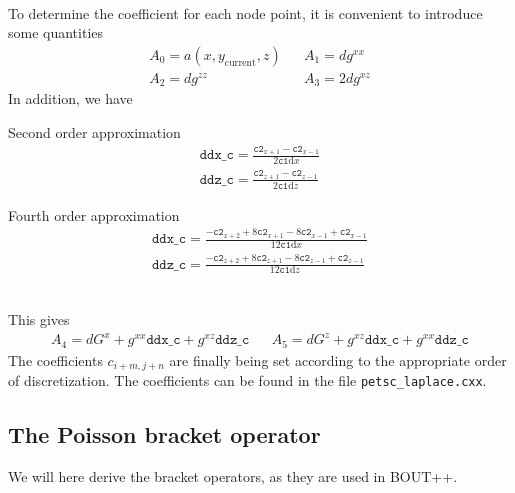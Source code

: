 \documentclass[12pt]{article}
\begin{document}
%
\\ To determine the coefficient for each node point, it is convenient to
introduce some quantities
%
\begin{align*}
    &A_0 = a(x,y_{\text{current}},z)& &A_1 = dg^{xx}&\\ &A_2 = dg^{zz}& &A_3 =
    2dg^{xz}&
\end{align*}
%
In addition, we have\\
%
\begin{minipage}{0.45\textwidth}
Second order approximation
%
\begin{align*}
    \texttt{ddx\_c} = \frac{\texttt{c2}_{x+1} - \texttt{c2}_{x-1} }{
    2\texttt{c1}\text{d}x}\\
    \texttt{ddz\_c} = \frac{\texttt{c2}_{z+1} - \texttt{c2}_{z-1} }{
    2\texttt{c1}\text{d}z}
\end{align*}
%
\end{minipage}
%
\hspace{1cm}
%
\begin{minipage}{0.45\textwidth}
Fourth order approximation
%
\begin{align*}
    \texttt{ddx\_c} = \frac{-\texttt{c2}_{x+2} + 8\texttt{c2}_{x+1} -
    8\texttt{c2}_{x-1} + \texttt{c2}_{x-1} }{ 12\texttt{c1}\text{d}x}\\
    \texttt{ddz\_c} = \frac{-\texttt{c2}_{z+2} + 8\texttt{c2}_{z+1} -
    8\texttt{c2}_{z-1} + \texttt{c2}_{z-1} }{ 12\texttt{c1}\text{d}z}
\end{align*}
%
\end{minipage}
%
\\
%
This gives
%
\begin{align*}
    &A_4 = dG^x + g^{xx}\texttt{ddx\_c} + g^{xz}\texttt{ddz\_c}& &A_5 = dG^z +
    g^{xz}\texttt{ddx\_c} + g^{xx}\texttt{ddz\_c}&
\end{align*}
%
The coefficients $c_{i+m,j+n}$ are finally being set according to the
appropriate order of discretization. The coefficients can be found in the file
\texttt{petsc\_laplace.cxx}.



\subsection{The Poisson bracket operator}
%
We will here derive the bracket operators, as they are used in BOUT++.
\end{document}
